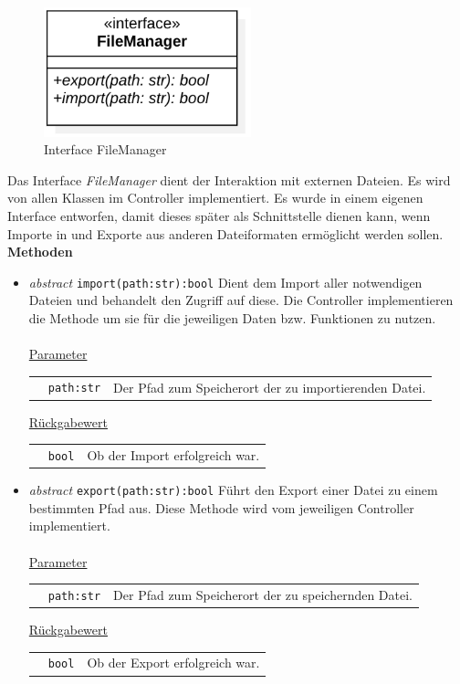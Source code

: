 \documentclass{article}
\begin{document}
\begin{figure}[H]%
    \centering
    \includegraphics[width=6cm]{docs/entwurf/Floriane/FileManager.png}
    \caption{Interface FileManager}
\end{figure}

Das Interface \textit{FileManager} dient der Interaktion mit externen Dateien. Es wird von allen Klassen im Controller implementiert. Es wurde in einem eigenen Interface entworfen, damit dieses später als Schnittstelle dienen kann, wenn Importe in und Exporte aus anderen Dateiformaten ermöglicht werden sollen.
\newline \newline
\textbf{{Methoden}}
\begin{itemize}
\item \textit{\flqq{}abstract\frqq} \texttt{import(path:str):bool} \newline Dient dem Import aller notwendigen Dateien und behandelt den Zugriff auf diese. Die Controller implementieren die Methode um sie für die jeweiligen Daten bzw. Funktionen zu nutzen.
\\\\
\underline{{Parameter}}

\begin{tabular}{lll}
 & \texttt{path:str} & Der Pfad zum Speicherort der zu importierenden Datei. \\
\end{tabular}

\underline{{Rückgabewert}}

\begin{tabular}{lll}
 & \texttt{bool} & Ob der Import erfolgreich war. \\
\end{tabular}

\item \textit{\flqq{}abstract\frqq} \texttt{export(path:str):bool} \newline Führt den Export einer Datei zu einem bestimmten Pfad aus. Diese Methode wird vom jeweiligen Controller implementiert.
\\\\
\underline{{Parameter}}

\begin{tabular}{lll}
 & \texttt{path:str} & Der Pfad zum Speicherort der zu speichernden Datei. \\
\end{tabular}

\underline{{Rückgabewert}}

\begin{tabular}{lll}
 & \texttt{bool} & Ob der Export erfolgreich war. \\
\end{tabular}
\end{itemize}
\end{document}
